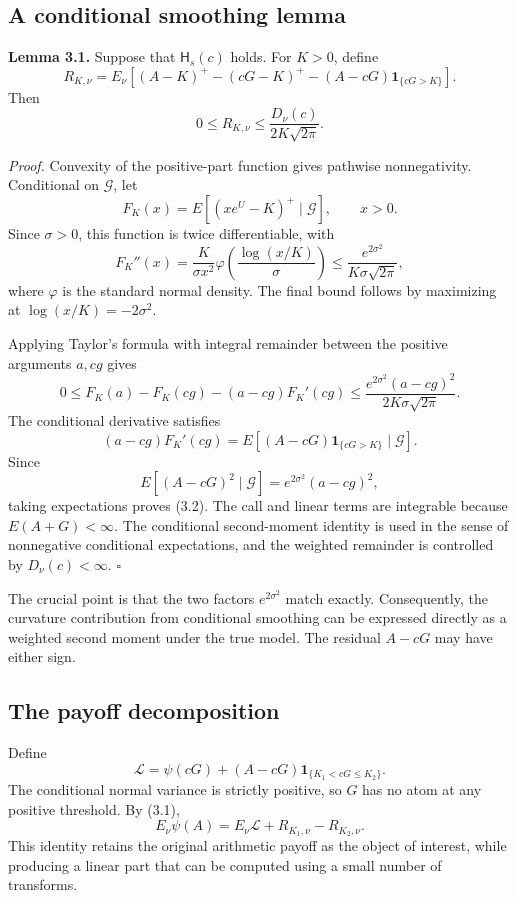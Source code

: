 \documentclass[11pt,a4paper]{article}
\begin{document}
\subsection{A conditional smoothing lemma}

\textbf{Lemma 3.1.} Suppose that \(\mathsf H_s(c)\) holds. For \(K>0\), define
\[
R_{K,\nu}=E_\nu\!\left[(A-K)^+-(cG-K)^+
-(A-cG)\mathbf1_{\{cG>K\}}\right].
\tag{3.1}
\]
Then
\[
0\le R_{K,\nu}\le \frac{D_\nu(c)}{2K\sqrt{2\pi}}.
\tag{3.2}
\]

\textit{Proof.} Convexity of the positive-part function gives pathwise nonnegativity. Conditional on \(\mathcal G\), let
\[
F_K(x)=E[(xe^U-K)^+\mid\mathcal G],\qquad x>0.
\]
Since \(\sigma>0\), this function is twice differentiable, with
\[
F_K''(x)=\frac{K}{\sigma x^2}
\varphi\!\left(\frac{\log(x/K)}{\sigma}\right)
\le\frac{e^{2\sigma^2}}{K\sigma\sqrt{2\pi}},
\tag{3.3}
\]
where \(\varphi\) is the standard normal density. The final bound follows by maximizing at
\(\log(x/K)=-2\sigma^2\).

Applying Taylor's formula with integral remainder between the positive arguments \(a,cg\) gives
\[
0\le F_K(a)-F_K(cg)-(a-cg)F_K'(cg)
\le \frac{e^{2\sigma^2}(a-cg)^2}{2K\sigma\sqrt{2\pi}}.
\]
The conditional derivative satisfies
\[
(a-cg)F_K'(cg)
=E[(A-cG)\mathbf1_{\{cG>K\}}\mid\mathcal G].
\]
Since
\[
E[(A-cG)^2\mid\mathcal G]=e^{2\sigma^2}(a-cg)^2,
\]
taking expectations proves (3.2). The call and linear terms are integrable because \(E(A+G)<\infty\). The conditional second-moment identity is used in the sense of nonnegative conditional expectations, and the weighted remainder is controlled by \(D_\nu(c)<\infty\). \hfill\(\square\)

The crucial point is that the two factors \(e^{2\sigma^2}\) match exactly. Consequently, the curvature contribution from conditional smoothing can be expressed directly as a weighted second moment under the true model. The residual \(A-cG\) may have either sign.

\subsection{The payoff decomposition}

Define
\[
\mathcal L=\psi(cG)+(A-cG)\mathbf1_{\{K_1<cG\le K_2\}}.
\tag{3.4}
\]
The conditional normal variance is strictly positive, so \(G\) has no atom at any positive threshold. By (3.1),
\[
E_\nu\psi(A)=E_\nu\mathcal L+R_{K_1,\nu}-R_{K_2,\nu}.
\tag{3.5}
\]
This identity retains the original arithmetic payoff as the object of interest, while producing a linear part that can be computed using a small number of transforms.
\end{document}
